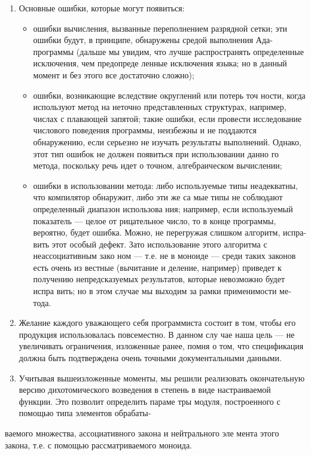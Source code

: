 \documentclass{mai_book}
\begin{document}
\begin{enumerate}
\item Основные ошибки, которые могут появиться:
\begin{itemize}
\item ошибки вычисления, вызванные переполнением разрядной
сетки; эти ошибки будут, в принципе, обнаружены средой
выполнения Ада-программы (дальше мы увидим, что лучше
распространять определенные исключения, чем предопреде­
ленные исключения языка; но в данный момент и без этого
все достаточно сложно);
\item ошибки, возникающие вследствие округлений или потерь точ­
ности, когда используют метод на неточно представленных
структурах, например, числах с плавающей запятой; такие
ошибки, если провести исследование числового поведения
программы, неизбежны и не поддаются обнаружению, если
серьезно не изучать результаты выполнений. Однако, этот
тип ошибок не должен появиться при использовании данно­
го метода, поскольку речь идет о точном, алгебраическом
вычислении;
\item ошибки в использовании метода: либо используемые типы
неадекватны, что компилятор обнаружит, либо эти же са­
мые типы не соблюдают определенный диапазон использова­
ния; например, если используемый показатель — целое от­
рицательное число, то в конце программы, вероятно, будет
ошибка. Можно, не перегружая слишком алгоритм, испра­
вить этот особый дефект.
Зато использование этого алгоритма с неассоциативным зако­
ном — т.е. не в моноиде — среди таких законов есть очень из­
вестные (вычитание и деление, например) приведет к получению
непредсказуемых результатов, которые невозможно будет испра­
вить; но в этом случае мы выходим за рамки применимости ме­
тода.
\end{itemize}
\item Желание каждого уважающего себя программиста состоит в том,
чтобы его продукция использовалась повсеместно. В данном слу­
чае наша цель — не увеличивать ограничения, изложенные ранее,
помня о том, что спецификация должна быть подтверждена очень
точными документальными данными.
\item Учитывая вышеизложенные моменты, мы решили реализовать
окончательную версию дихотомического возведения в степень в
виде настраиваемой функции. Это позволит определить параме­
тры модуля, построенного с помощью типа элементов обрабаты-
\end{enumerate}
\newpage

\begin{center}
\parbox{12cm}{
ваемого множества, ассоциативного закона и нейтрального эле­
мента этого закона, т.е. с помощью рассматриваемого моноида.
}
\end{center}
\end{document}
